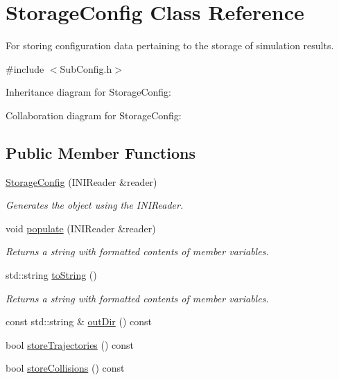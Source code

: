 \hypertarget{classStorageConfig}{\section{Storage\+Config Class Reference}
\label{classStorageConfig}
}


For storing configuration data pertaining to the storage of simulation results.  




{\ttfamily \#include $<$Sub\+Config.\+h$>$}



Inheritance diagram for Storage\+Config\+:


Collaboration diagram for Storage\+Config\+:
\subsection*{Public Member Functions}
\begin{DoxyCompactItemize}
\item 
\hyperlink{classStorageConfig_ac444d29b4dd7ee8a4db1942457bf87d0}{Storage\+Config} (I\+N\+I\+Reader \&reader)
\begin{DoxyCompactList}\small\item\em Generates the object using the I\+N\+I\+Reader. \end{DoxyCompactList}\item 
void \hyperlink{classStorageConfig_a35f314733d8173fb293fdc8366d682eb}{populate} (I\+N\+I\+Reader \&reader)
\begin{DoxyCompactList}\small\item\em Returns a string with formatted contents of member variables. \end{DoxyCompactList}\item 
std\+::string \hyperlink{classStorageConfig_a999c3186d9b0135535ab4d672fb9a094}{to\+String} ()
\begin{DoxyCompactList}\small\item\em Returns a string with formatted contents of member variables. \end{DoxyCompactList}\item 
const std\+::string \& \hyperlink{classStorageConfig_aaa33e5cb366baf8e528972764faf81e3}{out\+Dir} () const 
\item 
bool \hyperlink{classStorageConfig_ac1a3b65b91881780071c8aec862ced7b}{store\+Trajectories} () const 
\item 
bool \hyperlink{classStorageConfig_aed9d943a7ba185be8eec890e5fa3ca00}{store\+Collisions} () const 
\end{DoxyCompactItemize}
